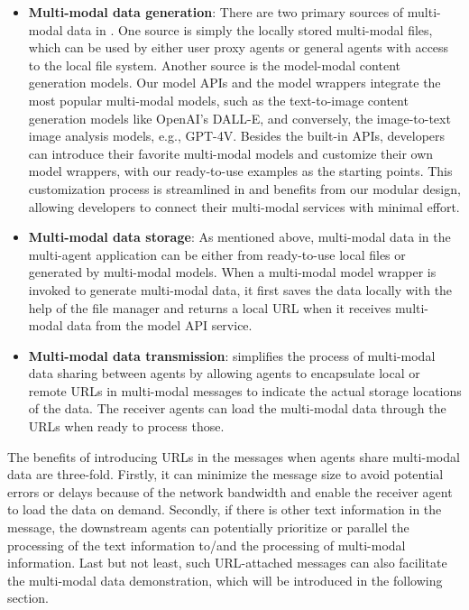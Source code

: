 \begin{itemize}
    \item 
    \textbf{Multi-modal data generation}:
    There are two primary sources of multi-modal data in \ours.
    One source is simply the locally stored multi-modal files, which can be used by either user proxy agents or general agents with access to the local file system.
    Another source is the model-modal content generation models.
    Our model APIs and the model wrappers integrate the most popular multi-modal models, such as the text-to-image content generation models like OpenAI's DALL-E, and conversely, the image-to-text image analysis models, e.g., GPT-4V.
    Besides the built-in APIs, developers can introduce their favorite multi-modal models and customize their own model wrappers, with our ready-to-use examples as the starting points.
    This customization process is streamlined in \ours and benefits from our modular design, allowing developers to connect their multi-modal services with minimal effort.
    \item 
    \textbf{Multi-modal data storage}:
    As mentioned above, multi-modal data in the multi-agent application can be either from ready-to-use local files or generated by multi-modal models.
    When a multi-modal model wrapper is invoked to generate multi-modal data, it first saves the data locally with the help of the file manager and returns a local URL when it receives multi-modal data from the model API service. 
    \item
    \textbf{Multi-modal data transmission}:
    \ours simplifies the process of multi-modal data sharing between agents by allowing agents to encapsulate local or remote URLs in multi-modal messages to indicate the actual storage locations of the data.
    The receiver agents can load the multi-modal data through the URLs when ready to process those.
\end{itemize}

The benefits of introducing URLs in the messages when agents share multi-modal data are three-fold.
Firstly, it can minimize the message size to avoid potential errors or delays because of the network bandwidth and enable the receiver agent to load the data on demand.
Secondly, if there is other text information in the message, the downstream agents can potentially prioritize or parallel the processing of the text information to/and the processing of multi-modal information.
Last but not least, such URL-attached messages can also facilitate the multi-modal data demonstration, which will be introduced in the following section.

